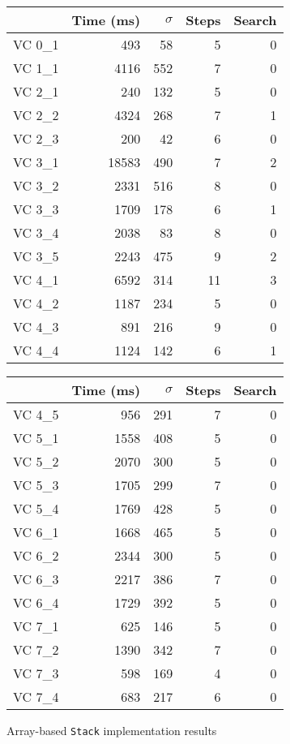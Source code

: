 \begin{figure}
	\centering
	\begin{tabular}{lrrrr}
		\toprule
			& Time (ms)	& $\sigma$& Steps & Search \\
		\midrule
		VC 0\_1	& 493		& 58	& 5 	& 0     \\
		VC 1\_1	& 4116		& 552	& 7 	& 0     \\
		VC 2\_1	& 240		& 132	& 5 	& 0     \\
		VC 2\_2	& 4324		& 268	& 7 	& 1     \\
		VC 2\_3	& 200		& 42	& 6 	& 0     \\
		VC 3\_1	& 18583		& 490	& 7 	& 2     \\
		VC 3\_2	& 2331		& 516	& 8 	& 0     \\
		VC 3\_3	& 1709		& 178	& 6 	& 1     \\
		VC 3\_4	& 2038		& 83	& 8 	& 0     \\
		VC 3\_5	& 2243		& 475	& 9 	& 2     \\
		VC 4\_1	& 6592 		& 314	& 11	& 3     \\
		VC 4\_2	& 1187		& 234	& 5 	& 0     \\
		VC 4\_3	& 891		& 216	& 9 	& 0     \\
		VC 4\_4	& 1124		& 142	& 6 	& 1     \\
		\bottomrule
	\end{tabular}
	\qquad
	\begin{tabular}{lrrrr}
		\toprule
			& Time (ms)	& $\sigma$& Steps & Search \\
		\midrule
		VC 4\_5	& 956		& 291	& 7 	& 0     \\
		VC 5\_1	& 1558 		& 408	& 5 	& 0     \\
		VC 5\_2	& 2070		& 300	& 5 	& 0     \\
		VC 5\_3	& 1705		& 299	& 7 	& 0     \\
		VC 5\_4	& 1769		& 428	& 5 	& 0     \\
		VC 6\_1	& 1668 		& 465	& 5 	& 0     \\
		VC 6\_2	& 2344		& 300	& 5 	& 0     \\
		VC 6\_3	& 2217		& 386	& 7 	& 0     \\
		VC 6\_4	& 1729		& 392	& 5 	& 0     \\
		VC 7\_1	& 625 		& 146	& 5 	& 0     \\
		VC 7\_2	& 1390		& 342	& 7 	& 0     \\
		VC 7\_3	& 598		& 169	& 4 	& 0     \\
		VC 7\_4	& 683		& 217	& 6 	& 0     \\
		\bottomrule
	\end{tabular}
	\caption{Array-based \texttt{Stack} implementation results\label{fig:stackResults}}
\end{figure}


